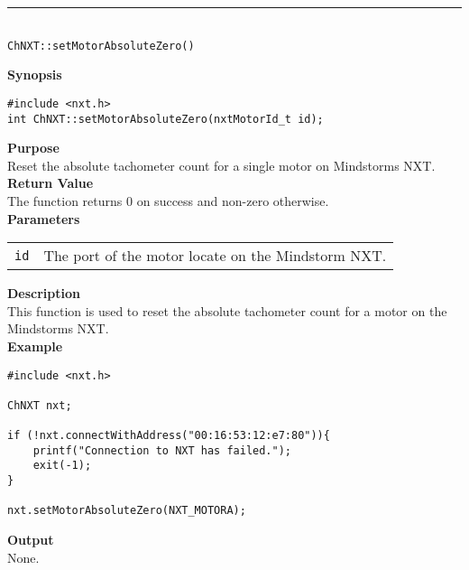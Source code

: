 \noindent
\vspace{5pt}
\rule{4.5in}{0.015in}\\
\noindent
{\LARGE \texttt{ChNXT::setMotorAbsoluteZero()} }\\


\noindent
{\bf Synopsis}
\begin{lstlisting}
#include <nxt.h>
int ChNXT::setMotorAbsoluteZero(nxtMotorId_t id);
\end{lstlisting}

\noindent
{\bf Purpose}\\
Reset the absolute tachometer count for a single motor on Mindstorms NXT.\\

\noindent
{\bf Return Value}\\
The function returns 0 on success and non-zero otherwise.\\

\noindent
{\bf Parameters}\\
\vspace{-0.1in}
\begin{description}
\item
\begin{tabular}{p{20mm}p{135mm}}
\texttt{id} &The port of the motor locate on the Mindstorm NXT.\\
\end{tabular}
\end{description}

\noindent
{\bf Description}\\
This function is used to reset the absolute tachometer count for a motor on the Mindstorms NXT.\\

\noindent
{\bf Example}
\begin{lstlisting}
#include <nxt.h> 

ChNXT nxt;

if (!nxt.connectWithAddress("00:16:53:12:e7:80")){
    printf("Connection to NXT has failed.");
    exit(-1);
}
    
nxt.setMotorAbsoluteZero(NXT_MOTORA);
\end{lstlisting}

\noindent
{\bf Output}\\
None.\\
\\
